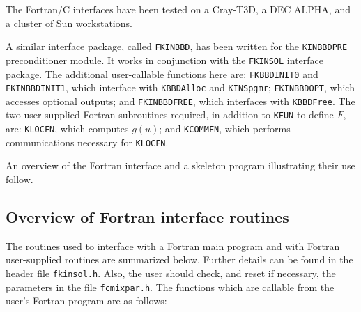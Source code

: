 The Fortran/C interfaces have been tested on a Cray-T3D, a DEC ALPHA, and a 
cluster of Sun workstations.

A similar interface package, called {\tt FKINBBD}, has been written for the 
{\tt KINBBDPRE} preconditioner module. It works in conjunction with the
{\tt FKINSOL} interface package. The additional user-callable functions 
here are: {\tt FKBBDINIT0} and {\tt FKINBBDINIT1}, which interface with 
{\tt KBBDAlloc} and {\tt KINSpgmr};
{\tt FKINBBDOPT}, which accesses optional outputs; and {\tt FKINBBDFREE}, which
interfaces with {\tt KBBDFree}. The two user-supplied Fortran subroutines
required, in addition to {\tt KFUN} to define $F$, are: {\tt KLOCFN}, which
computes $g(u)$; and {\tt KCOMMFN}, which performs communications necessary
for {\tt KLOCFN}.

An overview of the Fortran interface and a skeleton program illustrating their
use follow.

\subsection{Overview of Fortran interface routines}

The routines used to interface with a Fortran main program and with Fortran
user-supplied routines are summarized below.  Further details can be
found in the header file {\tt fkinsol.h}.  Also, the user should check,
and reset if necessary, the parameters in the file {\tt fcmixpar.h}.
The functions which are callable from the user's Fortran program are
as follows:


